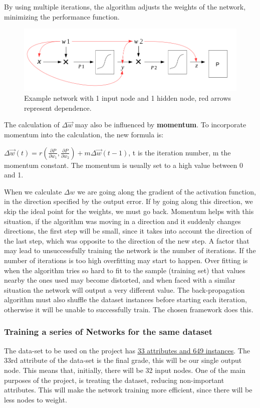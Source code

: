 \documentclass[11pt]{article}
\begin{document}
By using multiple iterations, the algorithm adjusts the weights of the network, minimizing the performance function.

\begin{figure}[H]
\label{fig:example}
\includegraphics[scale=0.4]{example.png}
\centering
\caption{Example network with 1 input node and 1 hidden node, red arrows represent dependence.}
\end{figure}

The calculation of $\Delta \overrightarrow{w}$ may also be influenced by \textbf{momentum}. To incorporate momentum into the calculation, the new formula is:

$\Delta \overrightarrow{w}(t) = r(\frac{\partial P}{\partial w_1} , \frac{\partial P}{\partial w_2}) + m \Delta \overrightarrow{w}(t-1)$, t is the iteration number, m the momentum constant. The momentum is usually set to a high value between 0 and 1.

When we calculate $\Delta w$ we are going along the gradient of the activation function, in the direction specified by the output error. If by going along this direction, we skip the ideal point for the weights, we must go back. Momentum helps with this situation, if the algorithm was moving in a direction and it suddenly changes directions, the first step will be small, since it takes into account the direction of the last step, which was opposite to the direction of the new step.
\hfill \break
\hfill \break
A factor that may lead to unsuccessfully training the network is the number of iterations. If the number of iterations is too high overfitting may start to happen. Over fitting is when the algorithm tries so hard to fit to the sample (training set) that values nearby the ones used may become distorted, and when faced with a similar situation the network will output a very different value.
\hfill \break
\hfill \break
The back-propagation algorithm must also shuffle the dataset instances before starting each iteration, otherwise it will be unable to successfully train. The chosen framework does this.
\subsubsection{Training a series of Networks for the same dataset}
\label{sec:training}
The data-set to be used on the project has \href{http://archive.ics.uci.edu/ml/datasets/Student+Performance}{\underline{33 attributes and 649 instances}}.
The 33rd attribute of the data-set is the final grade, this will be our single output node. This means that, initially, there will be 32 input nodes.
One of the main purposes of the project, is treating the dataset, reducing non-important attributes. This will make the network training more efficient, since there will be less nodes to weight.
\end{document}
